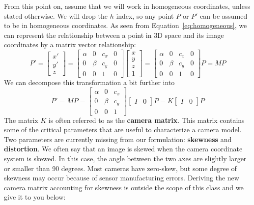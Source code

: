 \documentclass[a4paper, 12pt]{article}
\renewcommand\emph{\textbf}
\begin{document}
From this point on, assume that we will work in homogeneous coordinates, unless stated otherwise. We will drop the $h$ index, so any point $P$ or $P'$ can be assumed to be in homogeneous coordinates. As seen from Equation~\ref{eq:homogeneous}, we can represent the relationship between a point in 3D space and its image coordinates by a matrix vector relationship:
\begin{equation}
    P' = \begin{bmatrix}x'\\y'\\ z\end{bmatrix}=\begin{bmatrix}
    \alpha & 0 & c_x & 0\\
    0 & \beta & c_y & 0 \\ 
    0 & 0 & 1 & 0
    \end{bmatrix}\begin{bmatrix}x\\y\\z\\1\end{bmatrix}=
    \begin{bmatrix}
    \alpha & 0 & c_x & 0\\
    0 & \beta & c_y & 0 \\ 
    0 & 0 & 1 & 0
    \end{bmatrix}P = MP 
    \label{eq:canonical}
\end{equation}
We can decompose this transformation a bit further into 
\begin{equation}
P' = MP = \begin{bmatrix}
    \alpha & 0 & c_x \\
    0 & \beta & c_y  \\ 
    0 & 0 & 1 
    \end{bmatrix}\begin{bmatrix}I & 0\end{bmatrix}P = K\begin{bmatrix}I & 0\end{bmatrix}P
    \label{eq:decomposedHomogenousTransform}
\end{equation}
The matrix $K$ is often referred to as the \emph{camera matrix}. This matrix contains some of the critical parameters that are useful to characterize a camera model. Two parameters are currently missing from our formulation: \emph{skewness} and \emph{distortion}. We often say that an image is skewed when the camera coordinate system is skewed. In this case, the angle between the two axes are slightly larger or smaller than 90 degrees. Most cameras have zero-skew, but some degree of skewness may occur because of sensor manufacturing errors. Deriving the new camera matrix accounting for skewness is outside the scope of this class and we give it to you below:
\end{document}
